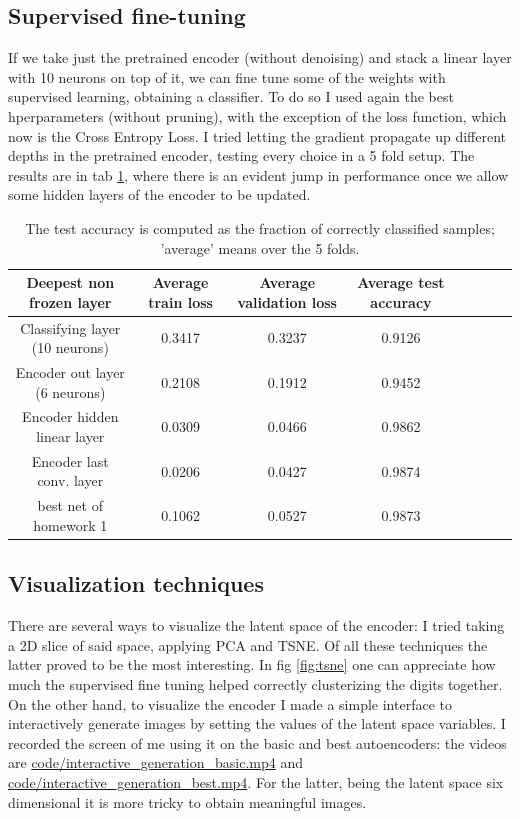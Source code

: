 \documentclass[a4paper, 11pt]{article}
\begin{document}
  \vspace{-0.7cm}
  \subsection{Supervised fine-tuning}
    If we take just the pretrained encoder (without denoising) and stack a linear layer with 10 neurons on top of it, we can fine tune some of the weights with supervised learning, obtaining a classifier. To do so I used again the best hperparameters (without pruning), with the exception of the loss function, which now is the Cross Entropy Loss. I tried letting the gradient propagate up different depths in the pretrained encoder, testing every choice in a 5 fold setup. The results are in tab \ref{tab:sup_ft}, where there is an evident jump in performance once we allow some hidden layers of the encoder to be updated.
    \begin{table}[H]
      \centering
      \begin{tabular}{c|ccccccc}
        Deepest non frozen layer & Average train loss & Average validation loss & Average test accuracy \\
        \midrule
        Classifying layer (10 neurons) & 0.3417 & 0.3237 & 0.9126 \\
        Encoder out layer (6 neurons) & 0.2108 & 0.1912 & 0.9452 \\
        Encoder hidden linear layer & 0.0309 & 0.0466 & 0.9862 \\
        Encoder last conv. layer & 0.0206 & 0.0427 & 0.9874 \\
        \midrule
        best net of homework 1 & 0.1062 & 0.0527 & 0.9873 \\
      \end{tabular}
      \caption{The test accuracy is computed as the fraction of correctly classified samples; 'average' means over the 5 folds.}
      \label{tab:sup_ft}
    \end{table}

  \subsection{Visualization techniques}
    There are several ways to visualize the latent space of the encoder: I tried taking a 2D slice of said space, applying PCA and TSNE. Of all these techniques the latter proved to be the most interesting. In fig \ref{fig:tsne} one can appreciate how much the supervised fine tuning helped correctly clusterizing the digits together. On the other hand, to visualize the encoder I made a simple interface to interactively generate images by setting the values of the latent space variables. I recorded the screen of me using it on the basic and best autoencoders: the videos are \url{code/interactive_generation_basic.mp4} and \url{code/interactive_generation_best.mp4}. For the latter, being the latent space six dimensional it is more tricky to obtain meaningful images.
\end{document}
